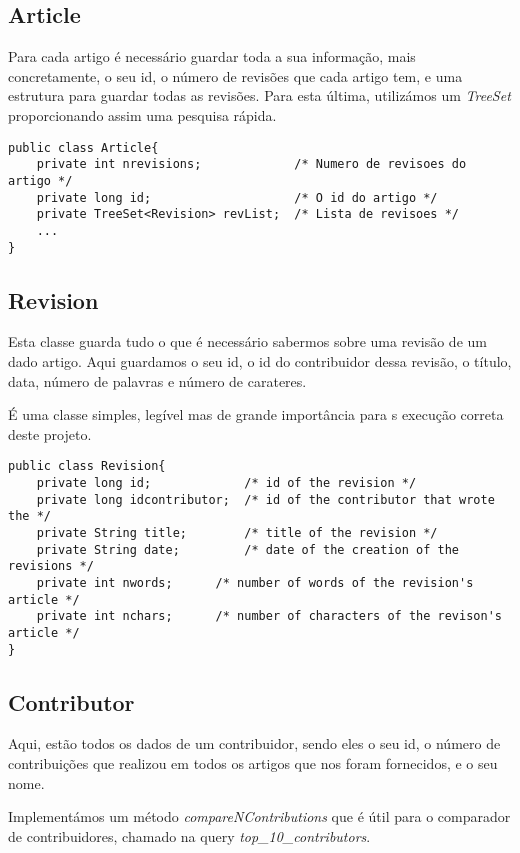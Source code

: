 \documentclass{article}
\begin{document}
\subsection{Article}
\par Para cada artigo é necessário guardar toda a sua informação, mais concretamente, o seu id, o número de revisões que cada artigo tem, e uma estrutura para guardar todas as revisões. Para esta última, utilizámos um \emph{TreeSet} proporcionando assim uma pesquisa rápida.

\begin{lstlisting}
public class Article{
    private int nrevisions;           	/* Numero de revisoes do artigo */
    private long id;                    /* O id do artigo */
    private TreeSet<Revision> revList;  /* Lista de revisoes */
    ...
}
\end{lstlisting}

\subsection{Revision}
\par Esta classe guarda tudo o que é necessário sabermos sobre uma revisão de um dado artigo. Aqui guardamos o seu id, o id do contribuidor dessa revisão, o título, data, número de palavras e número de carateres.
\par É uma classe simples, legível mas de grande importância para s execução correta deste projeto.

\begin{lstlisting}
public class Revision{
    private long id;             /* id of the revision */
    private long idcontributor;  /* id of the contributor that wrote the */
    private String title;        /* title of the revision */
    private String date;         /* date of the creation of the revisions */
    private int nwords;      /* number of words of the revision's article */
    private int nchars;      /* number of characters of the revison's article */
}
\end{lstlisting}

\clearpage

\subsection{Contributor}
\par Aqui, estão todos os dados de um contribuidor, sendo eles o seu id, o número de contribuições que realizou em todos os artigos que nos foram fornecidos, e o seu nome.
\par Implementámos um método \emph{compareNContributions} que é útil para o comparador de contribuidores, chamado na query \emph{top\_10\_contributors}.
\end{document}
